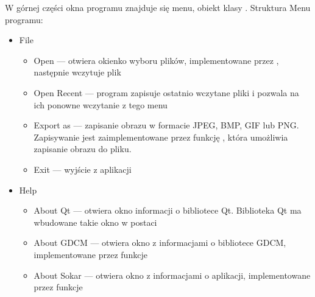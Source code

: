 \par
W górnej części okna programu znajduje się menu, obiekt klasy .
Struktura Menu programu:
\begin{itemize}
    \item File
          \begin{itemize}
              \item Open --- otwiera okienko wyboru plików, implementowane przez , następnie wczytuje plik
              \item Open Recent --- program zapisuje ostatnio wczytane pliki i pozwala na ich ponowne wczytanie z tego menu
              \item Export as --- zapisanie obrazu w formacie JPEG, BMP, GIF lub PNG.
                    Zapisywanie jest zaimplementowane przez funkcję , która umożliwia zapisanie obrazu do pliku.
              \item Exit --- wyjście z aplikacji
          \end{itemize}
    \item Help
          \begin{itemize}
              \item About Qt --- otwiera okno informacji o bibliotece Qt.
                    Biblioteka Qt ma wbudowane takie okno w postaci 
              \item About GDCM --- otwiera okno z informacjami o bibliotece GDCM, implementowane przez funkcje 
              \item About Sokar --- otwiera okno z informacjami o aplikacji, implementowane przez funkcje 
          \end{itemize}
\end{itemize}
